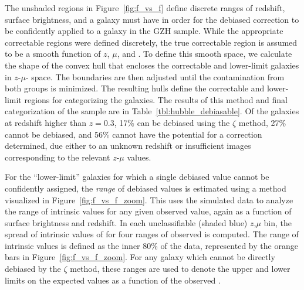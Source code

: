 \documentclass[twocolumn]{aastex6}
\begin{document}
The unshaded regions in Figure~\ref{fig:f_vs_f} define discrete ranges of redshift,
surface brightness, and \ffeatures{} a galaxy must have in order for the
debiased correction to be confidently applied to a galaxy in the GZH sample.
While the appropriate correctable regions were defined discretely, the true
correctable region is assumed to be a smooth function of $z$, $\mu$, and
\ffeatures{}. To define this smooth space, we calculate the shape of the convex
hull that encloses the correctable and lower-limit \ferengi{} galaxies in
$z$-$\mu$-\ffeatures{} space. The boundaries are then adjusted until the
contamination from both groups is minimized. The resulting hulls define the
correctable and lower-limit regions for categorizing the \hst{} galaxies. The
results of this method and final categorization of the \hst{} sample are in
Table~\ref{tbl:hubble_debiasable}. Of the galaxies at redshift higher than
$z=0.3$, 17\% can be debiased using the $\zeta$ method, 27\% cannot be
debiased, and 56\% cannot have the potential for a correction determined, due
either to an unknown redshift or insufficient \ferengi{} images corresponding
to the relevant $z$-$\mu$ values.

For the ``lower-limit'' galaxies for which a single debiased \ffeatures{} value
cannot be confidently assigned, the \emph{range} of debiased values is
estimated using a method visualized in Figure~\ref{fig:f_vs_f_zoom}. This uses the
\ferengi{} simulated data to analyze the range of intrinsic \ffeaturesrest{}
values for any given observed \ffeatures{} value, again as a function of
surface brightness and redshift. In each unclassifiable (shaded blue) $z$,$\mu$ bin, the spread of
intrinsic values of \ffeaturesrest{} for four ranges of observed \ffeatures is computed.
The range of intrinsic values is defined as the inner 80\% of the data,
represented by the orange bars in Figure~\ref{fig:f_vs_f_zoom}. For any galaxy which
cannot be directly debiased by the $\zeta$ method, these ranges are used to
denote the upper and lower limits on the expected values \ffeaturesrest{} as a
function of the observed \ffeatures. 
\end{document}
